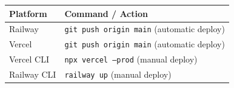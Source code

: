 \begin{center}
\begin{tabularx}{\textwidth}{l X}
\toprule
\textbf{Platform} & \textbf{Command / Action} \\
\midrule
Railway & \texttt{git push origin main} (automatic deploy) \\
Vercel & \texttt{git push origin main} (automatic deploy) \\
Vercel CLI & \texttt{npx vercel --prod} (manual deploy) \\
Railway CLI & \texttt{railway up} (manual deploy) \\
\bottomrule
\end{tabularx}
\end{center}
